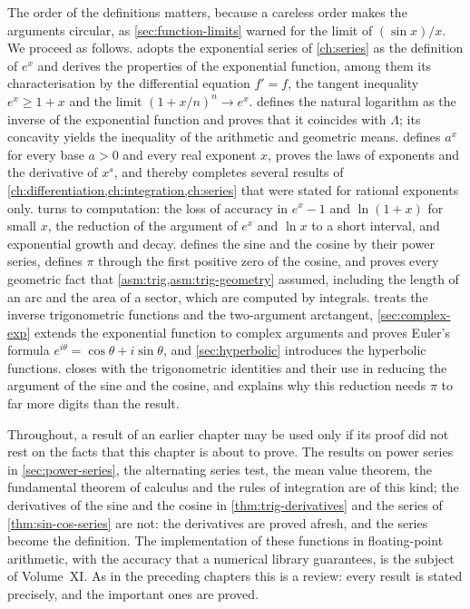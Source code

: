 The order of the definitions matters, because a careless order makes the arguments circular, as \cref{sec:function-limits} warned for the limit of $(\sin x)/x$. We proceed as follows.  adopts the exponential series of \cref{ch:series} as the definition of $e^x$ and derives the properties of the exponential function, among them its characterisation by the differential equation $f'=f$, the tangent inequality $e^x\ge1+x$ and the limit $(1+x/n)^n\to e^x$.  defines the natural logarithm as the inverse of the exponential function and proves that it coincides with $\Lambda$; its concavity yields the inequality of the arithmetic and geometric means.  defines $a^x$ for every base $a>0$ and every real exponent $x$, proves the laws of exponents and the derivative of $x^s$, and thereby completes several results of \cref{ch:differentiation,ch:integration,ch:series} that were stated for rational exponents only.  turns to computation: the loss of accuracy in $e^x-1$ and $\ln(1+x)$ for small $x$, the reduction of the argument of $e^x$ and $\ln x$ to a short interval, and exponential growth and decay.  defines the sine and the cosine by their power series, defines $\pi$ through the first positive zero of the cosine, and proves every geometric fact that \cref{asm:trig,asm:trig-geometry} assumed, including the length of an arc and the area of a sector, which are computed by integrals.  treats the inverse trigonometric functions and the two-argument arctangent, \cref{sec:complex-exp} extends the exponential function to complex arguments and proves Euler's formula $e^{i\theta}=\cos\theta+i\sin\theta$, and \cref{sec:hyperbolic} introduces the hyperbolic functions.  closes with the trigonometric identities and their use in reducing the argument of the sine and the cosine, and explains why this reduction needs $\pi$ to far more digits than the result.

Throughout, a result of an earlier chapter may be used only if its proof did not rest on the facts that this chapter is about to prove. The results on power series in \cref{sec:power-series}, the alternating series test, the mean value theorem, the fundamental theorem of calculus and the rules of integration are of this kind; the derivatives of the sine and the cosine in \cref{thm:trig-derivatives} and the series of \cref{thm:sin-cos-series} are not: the derivatives are proved afresh, and the series become the definition. The implementation of these functions in floating-point arithmetic, with the accuracy that a numerical library guarantees, is the subject of Volume~XI. As in the preceding chapters this is a review: every result is stated precisely, and the important ones are proved.

